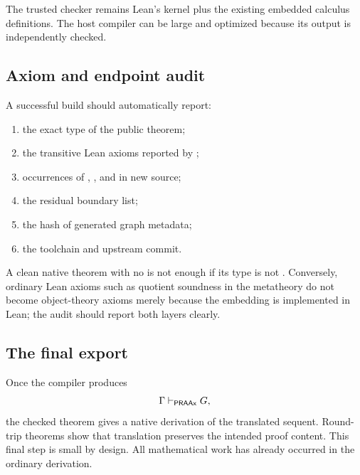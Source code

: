 The trusted checker remains Lean's kernel plus the existing embedded calculus definitions.  The host compiler can be large and optimized because its output is independently checked.

\subsection{Axiom and endpoint audit}

A successful build should automatically report:

\begin{enumerate}
\item the exact type of the public theorem;
\item the transitive Lean axioms reported by ;
\item occurrences of , , and  in new source;
\item the residual boundary list;
\item the hash of generated graph metadata;
\item the toolchain and upstream commit.
\end{enumerate}

A clean native theorem with no  is not enough if its type is not .  Conversely, ordinary Lean axioms such as quotient soundness in the metatheory do not become object-theory axioms merely because the embedding is implemented in Lean; the audit should report both layers clearly.

\subsection{The final export}

Once the compiler produces
\[
 \Gamma\vdash_{\mathsf{PRAAx}}G,
\]
the checked theorem  gives a native derivation of the translated sequent.  Round-trip theorems show that translation preserves the intended proof content.  This final step is small by design.  All mathematical work has already occurred in the ordinary derivation.
